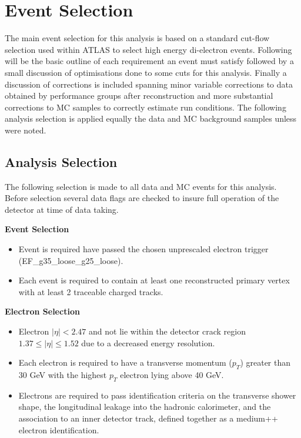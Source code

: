 \chapter{Event Selection}

The main event selection for this analysis is based on a standard cut-flow selection used within ATLAS to select high energy di-electron events. Following will be the basic outline of each requirement an event must satisfy followed by a small discussion of optimisations done to some cuts for this analysis. Finally a discussion of corrections is included spanning minor variable corrections to data obtained by performance groups after reconstruction and more substantial corrections to MC samples to correctly estimate run conditions.
The following analysis selection is applied equally the data and MC background samples unless were noted.






\section{Analysis Selection}

The following selection is made to all data and MC events for this analysis. Before selection several data flags are checked to insure full operation of the detector at time of data taking. 

{\bf Event Selection}
\begin{itemize}
\item Event is required have passed the chosen unprescaled electron trigger (EF\_g35\_loose\_g25\_loose).
\item Each event is required to contain at least one reconstructed primary vertex with at least 2 traceable charged tracks.
\end{itemize}


{\bf Electron Selection}
\begin{itemize}
\item Electron $|\eta| < 2.47$ and not lie within the detector crack region $1.37 \leq |\eta| \leq 1.52$ due to a decreased energy resolution.
\item Each electron is required to have a transverse momentum ($p_{T}$) greater than 30 GeV with the highest $p_{T}$ electron lying above 40 GeV.
\item Electrons are required to pass identification criteria on the transverse shower shape, the longitudinal leakage into the hadronic calorimeter, and the association to an inner detector track, defined together as a medium++ electron identification. %
\end{itemize}


